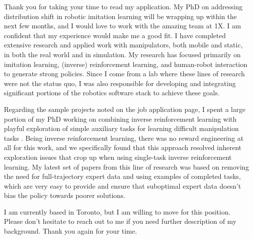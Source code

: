 Thank you for taking your time to read my application. My PhD on addressing distribution shift in robotic imitation learning will be wrapping up within the next few months, and I would love to work with the amazing team at 1X. I am confident that my experience would make me a good fit. I have completed extensive research and applied work with manipulators, both mobile and static, in both the real world and in simulation. My research has focused primarily on imitation learning, (inverse) reinforcement learning, and human-robot interaction to generate strong policies. Since I come from a lab where these lines of research were not the status quo, I was also responsible for developing and integrating significant portions of the robotics software stack to achieve these goals.

Regarding the sample projects noted on the job application page, I spent a large portion of my PhD working on combining inverse reinforcement learning with playful exploration of simple auxiliary tasks for learning difficult manipulation tasks \cite{ablett}. Being inverse reinforcement learning, there was no reward engineering at all for this work, and we specifically found that this approach resolved inherent exploration issues that crop up when using single-task inverse reinforcement learning. My latest set of papers from this line of research was based on removing the need for full-trajectory expert data and using examples of completed tasks, which are very easy to provide and ensure that suboptimal expert data doesn’t bias the policy towards poorer solutions.

I am currently based in Toronto, but I am willing to move for this position. Please don’t hesitate to reach out to me if you need further description of my background. Thank you again for your time.
